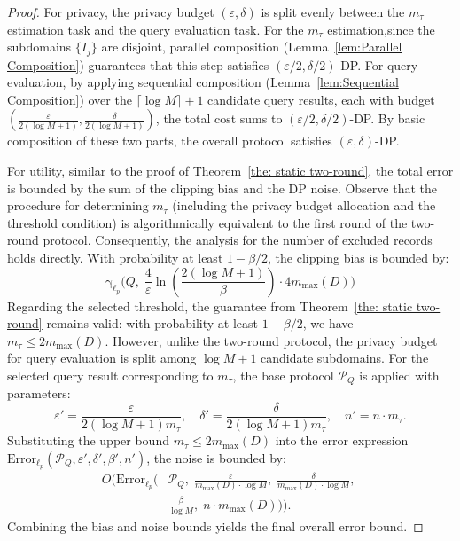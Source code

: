 \begin{proof}
     For privacy, the privacy budget $(\varepsilon, \delta)$ is split evenly between the $m_\tau$ estimation task and the query evaluation task.
    For the $m_\tau$ estimation,since the subdomains $\{I_j\}$ are disjoint, parallel composition (Lemma~\ref{lem:Parallel Composition}) guarantees that this step satisfies $(\varepsilon/2, \delta/2)$-DP.
    For query evaluation, by applying sequential composition (Lemma~\ref{lem:Sequential Composition}) over the $\lceil \log M \rceil + 1$ candidate query results, each with budget $(\frac{\varepsilon}{2(\log M+1)}, \frac{\delta}{2(\log M+1)})$, the total cost sums to $(\varepsilon/2, \delta/2)$-DP.
    By basic composition of these two parts, the overall protocol satisfies $(\varepsilon, \delta)$-DP.

    For utility, similar to the proof of Theorem~\ref{the: static two-round}, the total error is bounded by the sum of the clipping bias and the DP noise.
    Observe that the procedure for determining $m_\tau$ (including the privacy budget allocation and the threshold condition) is algorithmically equivalent to the first round of the two-round protocol. Consequently, the analysis for the number of excluded records holds directly. With probability at least $1-\beta/2$, the clipping bias is bounded by:
    \[
    \mathrm{\gamma}_{\ell_p}\!\Big(
        Q,\;
        \frac{4}{\varepsilon}\ln(\frac{2(\log M+1)}{\beta}) \cdot 4 m_{\max}(D)
    \Big)
    \]
    Regarding the selected threshold, the guarantee from Theorem~\ref{the: static two-round} remains valid: with probability at least $1-\beta/2$, we have $m_\tau \le 2m_{\max}(D)$.
    However, unlike the two-round protocol, the privacy budget for query evaluation is split among $\log M + 1$ candidate subdomains. For the selected query result corresponding to $m_\tau$, the base protocol $\mathcal{P}_Q$ is applied with parameters:
    \[
    \varepsilon' = \frac{\varepsilon}{2(\log M+1) m_\tau}, \quad \delta' = \frac{\delta}{2(\log M+1) m_\tau}, \quad n' = n \cdot m_\tau.
    \]
    Substituting the upper bound $m_\tau \le 2m_{\max}(D)$ into the error expression $\mathrm{Error}_{\ell_p}(\mathcal{P}_Q, \varepsilon', \delta', \beta', n')$, the noise is bounded by:
    \[
    \begin{aligned}
        O\Big( \mathrm{Error}_{\ell_p}\!\big(
        &\mathcal{P}_Q,\;
        \frac{\varepsilon} {m_{\max}(D) \cdot \log M},\;
        \frac{\delta}{m_{\max}(D) \cdot\log M},\; \\
        &\frac{\beta}{\log M},\;
        n \cdot m_{\max}(D)
    \big) \Big).
    \end{aligned}
    \]
    Combining the bias and noise bounds yields the final overall error bound.


\end{proof}
